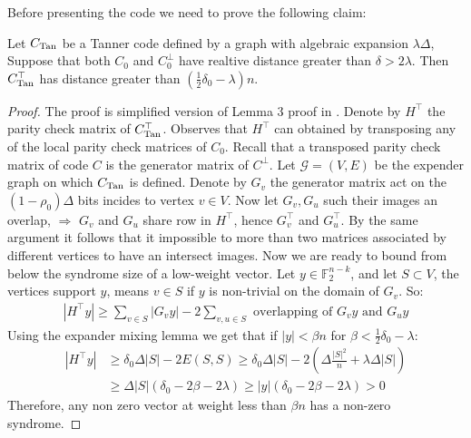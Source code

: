 Before presenting the code we need to prove the following claim:
\begin{claim}
  \label{claim:transposedtan}
  Let $C_{\text{Tan}}$ be a Tanner code defined by a graph with algebraic expansion $\lambda \Delta$, Suppose that both $C_{0}$ and $C_{0}^{\perp}$ have realtive distance greater than $\delta > 2\lambda$. Then $C_{\text{Tan}}^{\top}$ has distance greater than $(\frac{1}{2}\delta_{0} - \lambda)n$.
\end{claim}
\begin{proof}
  The proof is simplified version of Lemma 3 proof in \cite{Panteleev_2022}.  Denote by $H^\top$ the parity check matrix of $C_{\text{Tan}}^\top$. Observes that $H^\top$ can obtained by transposing any of the local parity check matrices of $C_0$. Recall that a transposed parity check matrix of code $C$ is the generator matrix of $C^\perp$. Let $\mathcal{G} = (V, E)$ be the expender graph on which $C_{\text{Tan}}$ is defined. Denote by $G_{v}$ the generator matrix act on the $(1-\rho_{0})\Delta$ bits incides to vertex $v \in V$. Now let $G_{v}, G_{u}$ such their images an overlap, $\Rightarrow$ $G_{v}$ and $G_{u}$ share row in $H^{\top}$, hence $G^{\top}_{v}$ and $G^{\top}_{u}$. By the same argument it follows that it impossible to more than two matrices associated by different vertices to have an intersect images. Now we are ready to bound from below the syndrome size of a low-weight vector. 
  Let $y \in \mathbb{F}_{2}^{n-k}$, and let $S \subset V$, the vertices support $y$, means $v \in S$ if $y$ is non-trivial on the domain of $G_{v}$. So:
  \begin{equation*}
    \begin{split}
|H^\top y| \ge \sum_{v\in S}{ |G_{v}y|  } - 2\sum_{v,u\in S}{ \text{ overlapping of } G_{v}y \text{ and } G_{u}y  }   
    \end{split}
  \end{equation*}
  Using the expander mixing lemma \cite{hoory2006expander} we get that if $|y| < \beta n$ for $\beta < \frac{1}{2}\delta_0 - \lambda$:
     \begin{equation*}
    \begin{split}
      | H^\top y | & \ge \delta_{0}\Delta|S| - 2E(S,S) \ge \delta_{0}\Delta|S| - 2\left( \Delta\frac{|S|^2}{n} + \lambda\Delta|S| \right) \\
      & \ge \Delta |S|\left( \delta_{0} - 2\beta - 2\lambda  \right) \ge |y| \left( \delta_{0} - 2\beta - 2\lambda  \right) > 0
    \end{split}
  \end{equation*}
  Therefore, any non zero vector at weight less than $\beta n$ has a non-zero syndrome.
\end{proof}

